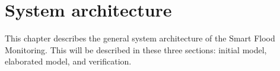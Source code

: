 \chapter{System architecture}
\label{ch:system}
This chapter describes the general system architecture of the Smart Flood Monitoring. This will be described in these three sections: initial model, elaborated model, and verification.





